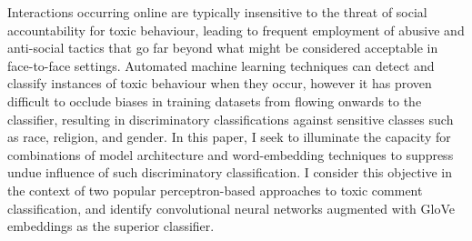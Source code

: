 Interactions occurring online are typically insensitive to the threat of social accountability for toxic behaviour, leading to frequent employment of abusive and anti-social tactics that go far beyond what might be considered acceptable in face-to-face settings. 
Automated machine learning techniques can detect and classify instances of toxic behaviour when they occur, however it has proven difficult to occlude biases in training datasets from flowing onwards to the classifier, resulting in discriminatory classifications against sensitive classes such as race, religion, and gender. 
In this paper, I seek to illuminate the capacity for combinations of model architecture and word-embedding techniques to suppress undue influence of such discriminatory classification.
I consider this objective in the context of two popular perceptron-based approaches to toxic comment classification, and identify convolutional neural networks augmented with GloVe embeddings as the superior classifier.

